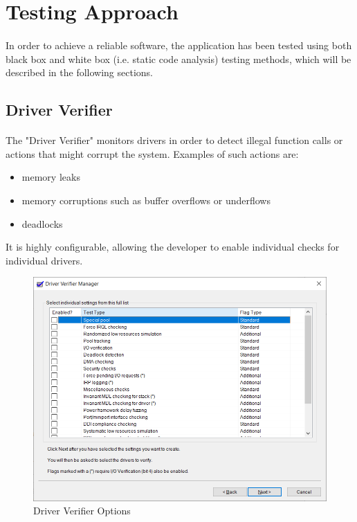 	\newpage
	\section{Testing Approach}
		\paragraph{}
		In order to achieve a reliable software, the application has been tested using both black box and white box (i.e. static code analysis) testing methods, which will be described in the following sections.
		
		\subsection{Driver Verifier}
		\paragraph{}
		The "Driver Verifier" monitors drivers in order to detect illegal function calls or actions that might corrupt the system\cite{MSDNDriverVerifier}. Examples of such actions are:
		\begin{itemize}
			\item memory leaks
			\item memory corruptions such as buffer overflows or underflows
			\item deadlocks
		\end{itemize}
	
		 It is highly configurable, allowing the developer to enable individual checks for individual drivers.
		
		\begin{figure}[h!]
			\begin{center}
				\includegraphics[scale=0.8]{images/DriverVerifier.png}
				\caption{Driver Verifier Options}
				\label{fig:DriverVerifierOptions}
			\end{center}
		\end{figure}
		
